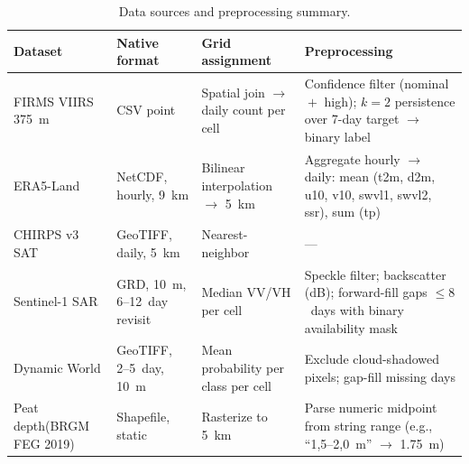 \begin{table}[h]
\centering
\caption{Data sources and preprocessing summary.}
\label{tab:preprocessing}
\begin{tabular}{p{2.4cm} p{2.8cm} p{2.8cm} p{3.0cm}}
\toprule
\textbf{Dataset} & \textbf{Native format} & \textbf{Grid assignment} & \textbf{Preprocessing} \\
\midrule
FIRMS VIIRS 375~m
    & CSV point
    & Spatial join $\to$ daily count per cell
    & Confidence filter (nominal $\!+\!$ high);
      $k=2$ persistence over 7-day target $\to$ binary label \\
\addlinespace
ERA5-Land
    & NetCDF, hourly, 9~km
    & Bilinear interpolation $\to$ 5~km
    & Aggregate hourly $\to$ daily:
      mean (t2m, d2m, u10, v10, swvl1, swvl2, ssr),
      sum (tp) \\
\addlinespace
CHIRPS v3 SAT
    & GeoTIFF, daily, 5~km
    & Nearest-neighbor
    & --- \\
\addlinespace
Sentinel-1 SAR
    & GRD, 10~m, 6--12~day revisit
    & Median VV/VH per cell
    & Speckle filter; backscatter (dB);
      forward-fill gaps $\leq 8$~days with binary availability mask \\
\addlinespace
Dynamic World
    & GeoTIFF, 2--5~day, 10~m
    & Mean probability per class per cell
    & Exclude cloud-shadowed pixels; gap-fill missing days \\
\addlinespace
Peat depth\hfill (BRGM FEG 2019)
    & Shapefile, static
    & Rasterize to 5~km
    & Parse numeric midpoint from string range
      (e.g., ``1,5--2,0~m'' $\to$ 1.75~m) \\
\bottomrule
\end{tabular}
\end{table}
